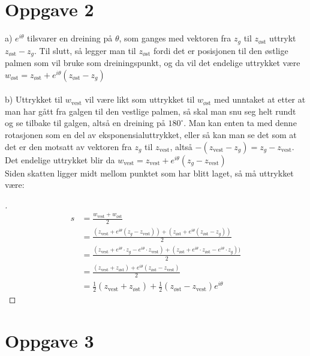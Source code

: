 \documentclass[12pt, a4paper]{article}
\begin{document}
\section*{Oppgave 2}
a) $e^{i\theta}$ tilsvarer en dreining på $\theta$, som ganges med vektoren fra $z_g$ til $z_\text{øst}$ uttrykt $z_\text{øst} - z_g$.
Til slutt, så legger man til $z_\text{øst}$ fordi det er posisjonen til den østlige palmen som vil bruke som dreiningspunkt, og da vil det endelige uttrykket være $w_\text{øst} = z_\text{øst} + e^{i\theta}(z_\text{øst} - z_g)$ \\
\\
b) Uttrykket til $w_\text{vest}$ vil være likt som uttrykket til $w_\text{øst}$ med unntaket at etter at man har gått fra galgen til den vestlige palmen, så skal man snu seg helt rundt og se tilbake til galgen, altså en dreining
på $180^\circ$. Man kan enten ta med denne rotasjonen som en del av eksponensialuttrykket, eller så kan man se det som at det er den motsatt av vektoren fra $z_g$ til $z_\text{vest}$, altså $-(z_\text{vest} - z_g) = z_g - z_\text{vest}$. \\
Det endelige uttrykket blir da $w_\text{vest} = z_\text{vest} + e^{i\theta}(z_g - z_\text{vest})$ \\
Siden skatten ligger midt mellom punktet som har blitt laget, så må uttrykket være:
\begin{proof}[\unskip\nopunct]
    \begin{equation}
        \begin{split}
            s &= \frac{w_\text{vest} + w_\text{øst}}{2} \\
              &= \frac{(z_\text{vest} + e^{i\theta}(z_g - z_\text{vest})) + (z_\text{øst} + e^{i\theta}(z_\text{øst} - z_g))}{2} \\
              &= \frac{(z_\text{vest} + e^{i\theta} \cdot z_g - e^{i\theta} \cdot z_\text{vest}) + (z_\text{øst} + e^{i\theta} \cdot z_\text{øst} - e^{i\theta} \cdot z_g))}{2} \\
              &= \frac{(z_\text{vest} + z_\text{øst}) + e^{i\theta}(z_\text{øst} - z_\text{vest})}{2} \\
              &= \frac{1}{2}(z_\text{vest} + z_\text{øst}) + \frac{1}{2}(z_\text{øst} - z_\text{vest})e^{i\theta}
        \end{split}
    \end{equation}
\end{proof}
\newpage


\section*{Oppgave 3}
\end{document}
